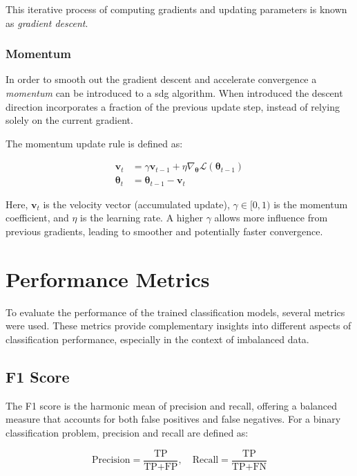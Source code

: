 \documentclass{pracalicmgr}
\begin{document}
This iterative process of computing gradients and updating parameters is known as \textit{gradient descent}.

\subsubsection{Momentum}

In order to smooth out the gradient descent and accelerate convergence a \textit{momentum} can be introduced to a sdg algorithm. When introduced the descent direction incorporates a fraction of the previous update step, instead of relying solely on the current gradient.

The momentum update rule is defined as:

\[
\begin{aligned}
\mathbf{v}_t &= \gamma \mathbf{v}_{t-1} + \eta \nabla_{\boldsymbol{\theta}} \mathcal{L}(\boldsymbol{\theta}_{t-1}) \\
\boldsymbol{\theta}_t &= \boldsymbol{\theta}_{t-1} - \mathbf{v}_t
\end{aligned}
\]

Here, \( \mathbf{v}_t \) is the velocity vector (accumulated update), \( \gamma \in [0,1) \) is the momentum coefficient, and \( \eta \) is the learning rate. A higher \( \gamma \) allows more influence from previous gradients, leading to smoother and potentially faster convergence.


\section{Performance Metrics}

To evaluate the performance of the trained classification models, several metrics were used. These metrics provide complementary insights into different aspects of classification performance, especially in the context of imbalanced data.

\subsection{F1 Score}

The F1 score is the harmonic mean of precision and recall, offering a balanced measure that accounts for both false positives and false negatives. For a binary classification problem, precision and recall are defined as:

\[
\text{Precision} = \frac{\text{TP}}{\text{TP} + \text{FP}}, \quad
\text{Recall} = \frac{\text{TP}}{\text{TP} + \text{FN}}
\]
\end{document}
